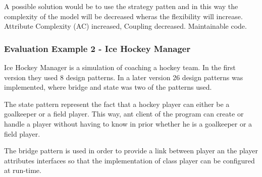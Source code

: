     A possible solution would be to use the strategy patten and in this way the complexity of the model will be decreased wheras the flexibility will increase. Attribute Complexity (AC) increased, Coupling decreased. Maintainable code. 

    \subsubsection*{Evaluation Example 2 - Ice Hockey Manager}
    Ice Hockey Manager is a simulation of coaching a hockey team. In the first version they used 8 design patterns. In a later version 26 design patterns was implemented, where bridge and state was two of the patterns used. 

    The state pattern represent the fact that a hockey player can either be a goalkeeper or a field player. This way, ant client of the program can create or handle a player without having to know in prior whether he is a goalkeeper or a field player. 

    The bridge pattern is used in order to provide a link between player an the player attributes interfaces so that the implementation of class player can be configured at run-time. 
    


